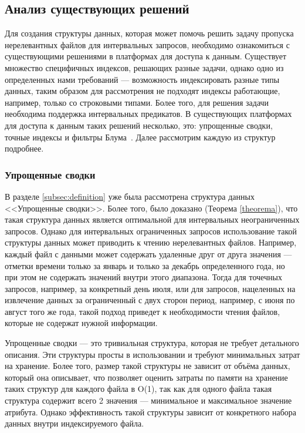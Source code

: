 \subsection{Анализ существующих решений}\label{subsec:indexes}

Для создания структуры данных, которая может помочь решить задачу пропуска нерелевантных файлов для интервальных запросов, необходимо ознакомиться с существующими решениями в платформах для доступа к данным. Существует множество специфичных индексов, решающих разные задачи, однако одно из определенных нами требований --- возможность индексировать разные типы данных, таким образом для рассмотрения не подходят индексы работающие, например, только со строковыми типами. Более того, для решения задачи необходима поддержка интервальных предикатов. В существующих платформах для доступа к данным таких решений несколько, это: упрощенные сводки, точные индексы и фильтры Блума~\cite{Extensible_data_skipping}. Далее рассмотрим каждую из структур подробнее.

\subsubsection{Упрощенные сводки}\label{column_stats}

В разделе \ref{subsec:definition} уже была рассмотрена структура данных {<<Упрощенные сводки>>}. Более того, было доказано (Теорема \ref{theorema}), что такая структура данных является оптимальной для интервальных неограниченных запросов. Однако для интервальных ограниченных запросов использование такой структуры данных может приводить к чтению нерелевантных файлов. Например, каждый файл с данными может содержать удаленные друг от друга значения --- отметки времени только за январь и только за декабрь определенного года, но при этом не содержать значений внутри этого диапазона. Тогда для точечных запросов, например, за конкретный день июля, или для запросов, нацеленных на извлечение данных за ограниченный с двух сторон период, например, с июня по август того же года, такой подход приведет к необходимости чтения файлов, которые не содержат нужной информации.

Упрощенные сводки --- это тривиальная структура, которая не требует детального описания. Эти структуры просты в использовании и требуют минимальных затрат на хранение. Более того, размер такой структуры не зависит от объёма данных, который она описывает, что позволяет оценить затраты по памяти на хранение таких структур для каждого файла в O(1), так как для одного файла такая структура содержит всего 2 значения --- минимальное и максимальное значение атрибута. Однако эффективность такой структуры зависит от конкретного набора данных внутри индексируемого файла.

